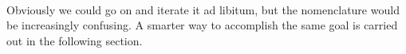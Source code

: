 \

Obviously we could go on and iterate it ad libitum, but the nomenclature would be increasingly confusing. A smarter way to accomplish the same goal is carried out in the following section.


\begin{comment}


TODO tohle znamena, ze prvoradovou formuli nerozlisime $V$ od (prvniho) nedosazitelneho $\kappa$

\begin{theorem}\label{th:refl_inaccessible}[Lévy] The following are equivalent:
\bce[(i)]
\item $\kappa$ is inaccessible.
\item For every $R \sub V_\kappa$ and every first-order formula $\varphi(R)$, $\varphi(R)$ reflects in $V_\kappa$.
\item For every $R \sub V_\kappa$, the set $C = \set{\alpha<\kappa}{\langle V_\alpha,\in,R \cap V_\alpha\rangle \el \langle V_\kappa,\in,R \rangle}$ is closed unbounded.
\ece
\end{theorem}
\begin{proof}
Let's start with $\bold{(i)} \then \bold{(iii)}$ in a~way similar to \cite{KanamoriBook}.\newline
The set $\set{\alpha<\kappa}{\langle V_\alpha,\in,R \cap V_\alpha \rangle \el \langle V_\kappa,\in,R\rangle}$ is clearly closed, it remains to show that it is also unbounded.
To do so, let $\alpha<\kappa$ be arbitrary. Define $\alpha_n < \kappa$ for $n\in\omega$ by recursion as follows:\newline
Set $\alpha_0=\alpha$. Given $\alpha_n < \kappa$ define $\alpha_{n+1}$ to be the least $\beta \geq \alpha_n$ such as 
whenever $y_1,\ldots,y_k \in V_{\alpha_n}$ and
$\langle V_{\kappa}, \in, R \rangle \models \exists v_0 \varphi [v_0, y_1, \ldots, y_k ]$
for some formula $\varphi$, there is an $x \in V_{\beta}$ such that $\langle V_{\kappa}, \in, R\rangle \models \varphi [x, y_1, \ldots, y_k]$.
\newline
Since $\kappa$ is inaccessible, $|V_{\alpha_n}| < \kappa$ and so $\alpha_{n+1} < \kappa$.\newline
Finally, set $\alpha = sup({\alpha_n | n \in \omega})$.  %
Then $\langle$
 $V_ \alpha, \in, R  \cap V_\alpha \rangle \prec \langle V_{\kappa}, \in, R\rangle$ by the usual (Tarski) criterion for elementary substructure.

\end{comment}
